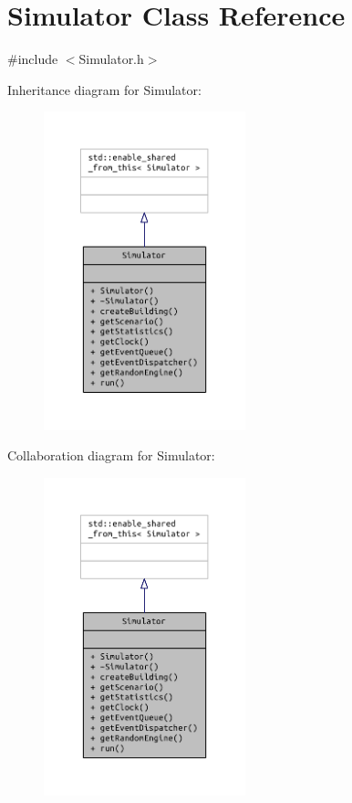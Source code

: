 \section{Simulator Class Reference}
\label{class_simulator}


{\ttfamily \#include $<$Simulator.\+h$>$}



Inheritance diagram for Simulator\+:
\nopagebreak
\begin{figure}[H]
\begin{center}
\leavevmode
\includegraphics[width=166pt]{class_simulator__inherit__graph}
\end{center}
\end{figure}


Collaboration diagram for Simulator\+:
\nopagebreak
\begin{figure}[H]
\begin{center}
\leavevmode
\includegraphics[width=166pt]{class_simulator__coll__graph}
\end{center}
\end{figure}
